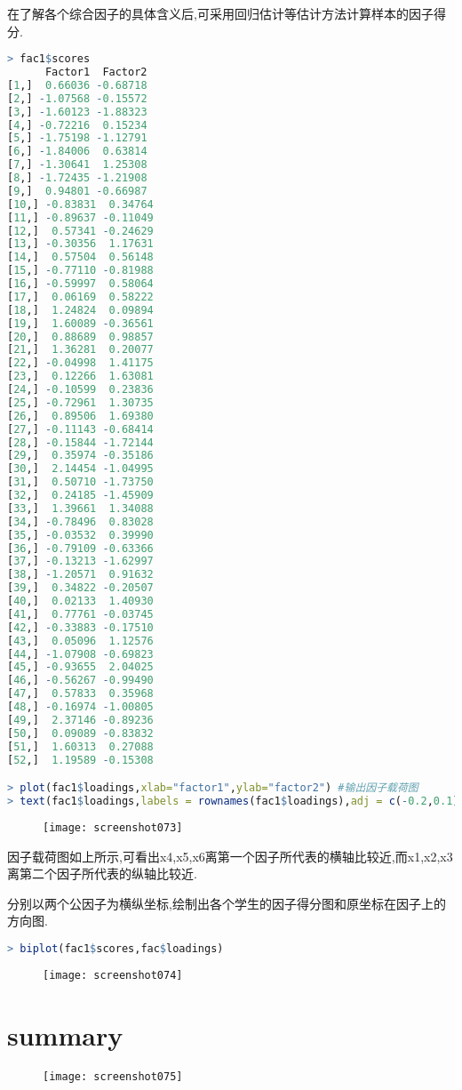 \documentclass[11pt,a4paper,oneside]{book}
\begin{document}
在了解各个综合因子的具体含义后,可采用回归估计等估计方法计算样本的因子得分.
\begin{lstlisting}[language=r]
> fac1$scores
      Factor1  Factor2
[1,]  0.66036 -0.68718
[2,] -1.07568 -0.15572
[3,] -1.60123 -1.88323
[4,] -0.72216  0.15234
[5,] -1.75198 -1.12791
[6,] -1.84006  0.63814
[7,] -1.30641  1.25308
[8,] -1.72435 -1.21908
[9,]  0.94801 -0.66987
[10,] -0.83831  0.34764
[11,] -0.89637 -0.11049
[12,]  0.57341 -0.24629
[13,] -0.30356  1.17631
[14,]  0.57504  0.56148
[15,] -0.77110 -0.81988
[16,] -0.59997  0.58064
[17,]  0.06169  0.58222
[18,]  1.24824  0.09894
[19,]  1.60089 -0.36561
[20,]  0.88689  0.98857
[21,]  1.36281  0.20077
[22,] -0.04998  1.41175
[23,]  0.12266  1.63081
[24,] -0.10599  0.23836
[25,] -0.72961  1.30735
[26,]  0.89506  1.69380
[27,] -0.11143 -0.68414
[28,] -0.15844 -1.72144
[29,]  0.35974 -0.35186
[30,]  2.14454 -1.04995
[31,]  0.50710 -1.73750
[32,]  0.24185 -1.45909
[33,]  1.39661  1.34088
[34,] -0.78496  0.83028
[35,] -0.03532  0.39990
[36,] -0.79109 -0.63366
[37,] -0.13213 -1.62997
[38,] -1.20571  0.91632
[39,]  0.34822 -0.20507
[40,]  0.02133  1.40930
[41,]  0.77761 -0.03745
[42,] -0.33883 -0.17510
[43,]  0.05096  1.12576
[44,] -1.07908 -0.69823
[45,] -0.93655  2.04025
[46,] -0.56267 -0.99490
[47,]  0.57833  0.35968
[48,] -0.16974 -1.00805
[49,]  2.37146 -0.89236
[50,]  0.09089 -0.83832
[51,]  1.60313  0.27088
[52,]  1.19589 -0.15308

> plot(fac1$loadings,xlab="factor1",ylab="factor2") #输出因子载荷图
> text(fac1$loadings,labels = rownames(fac1$loadings),adj = c(-0.2,0.1),cex = 1.2,pos=4)
\end{lstlisting}
\begin{figure}[H]
	\centering
	\texttt{[image: screenshot073]}
\end{figure}
因子载荷图如上所示,可看出x4,x5,x6离第一个因子所代表的横轴比较近,而x1,x2,x3离第二个因子所代表的纵轴比较近.

分别以两个公因子为横纵坐标,绘制出各个学生的因子得分图和原坐标在因子上的方向图.
\begin{lstlisting}[language=r]
> biplot(fac1$scores,fac$loadings)
\end{lstlisting}
\begin{figure}[H]
	\centering
	\texttt{[image: screenshot074]}
\end{figure}

\section{summary}
\begin{figure}[H]
	\centering
	\texttt{[image: screenshot075]}
\end{figure}
\end{document}
